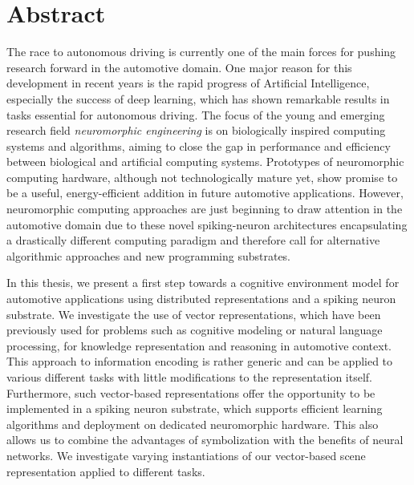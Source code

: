 \chapter*{Abstract}

The race to autonomous driving is currently one of the main forces for pushing research forward in the automotive domain.
One major reason for this development in recent years is the rapid progress of Artificial Intelligence, especially the success of deep learning, which has shown remarkable results in tasks essential for autonomous driving.
The focus of the young and emerging research field \emph{neuromorphic engineering} is on biologically inspired computing systems and algorithms, aiming to close the gap in performance and efficiency between biological and artificial computing systems.
Prototypes of neuromorphic computing hardware, although not technologically mature yet, show promise to be a useful, energy-efficient addition in future automotive applications.
However, neuromorphic computing approaches are just beginning to draw attention in the automotive domain due to these novel spiking-neuron architectures encapsulating a drastically different computing paradigm and therefore call for alternative algorithmic approaches and new programming substrates.

In this thesis, we present a first step towards a cognitive environment model for automotive applications using distributed representations and a spiking neuron substrate.
We investigate the use of vector representations, which have been previously used for problems such as cognitive modeling or natural language processing, for knowledge representation and reasoning in automotive context.
This approach to information encoding is rather generic and can be applied to various different tasks with little modifications to the representation itself.
Furthermore, such vector-based representations offer the opportunity to be implemented in a spiking neuron substrate, which supports efficient learning algorithms and deployment on dedicated neuromorphic hardware.
This also allows us to combine the advantages of symbolization with the benefits of neural networks.
We investigate varying instantiations of our vector-based scene representation applied to different tasks.

